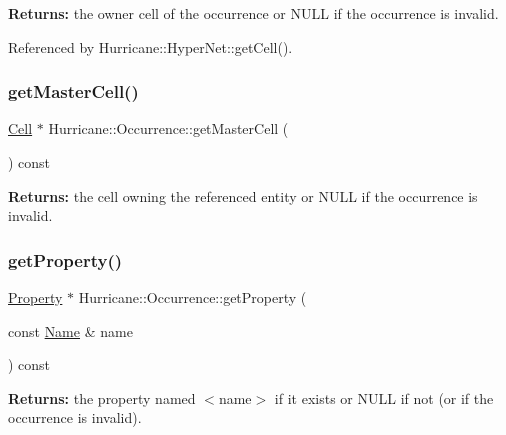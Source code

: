 {\bfseries Returns\+:} the owner cell of the occurrence or N\+U\+LL if the occurrence is invalid. 

Referenced by Hurricane\+::\+Hyper\+Net\+::get\+Cell().

\mbox{\label{classHurricane_1_1Occurrence_a5caeab69e23907909b3deb60ff26df15}} 
\subsubsection{\texorpdfstring{get\+Master\+Cell()}{getMasterCell()}}
{\footnotesize\ttfamily \mbox{\hyperlink{classHurricane_1_1Cell}{Cell}} $\ast$ Hurricane\+::\+Occurrence\+::get\+Master\+Cell (\begin{DoxyParamCaption}{ }\end{DoxyParamCaption}) const}

{\bfseries Returns\+:} the cell owning the referenced entity or N\+U\+LL if the occurrence is invalid. \mbox{\label{classHurricane_1_1Occurrence_ab2b36b219037a2310f6527a35a9a266f}} 
\subsubsection{\texorpdfstring{get\+Property()}{getProperty()}}
{\footnotesize\ttfamily \mbox{\hyperlink{classHurricane_1_1Property}{Property}} $\ast$ Hurricane\+::\+Occurrence\+::get\+Property (\begin{DoxyParamCaption}\item[{const \mbox{\hyperlink{classHurricane_1_1Name}{Name}} \&}]{name }\end{DoxyParamCaption}) const}

{\bfseries Returns\+:} the property named {\ttfamily $<$name$>$} if it exists or N\+U\+LL if not (or if the occurrence is invalid). \mbox{\label{classHurricane_1_1Occurrence_acbf59d6c01804e01f66d076c149abb49}} 
